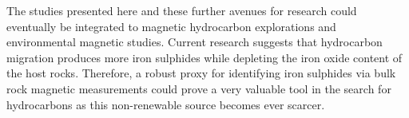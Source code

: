 The studies presented here and these further avenues for research could eventually be integrated to magnetic hydrocarbon explorations and environmental magnetic studies. Current research suggests that hydrocarbon migration produces more iron sulphides while depleting the iron oxide content of the host rocks. Therefore, a robust proxy for identifying iron sulphides via bulk rock magnetic measurements could prove a very valuable tool in the search for hydrocarbons as this non-renewable source becomes ever scarcer.\par

\renewcommand\bibname{{References}}


